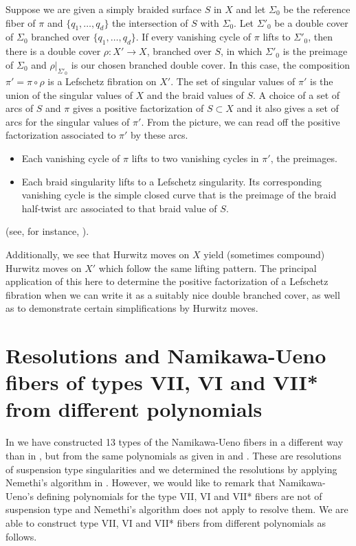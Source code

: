\documentclass[11pt,letterpaper,reqno]{amsart}
\theoremstyle{remark}
\begin{document}
Suppose we are given a simply braided surface $S$ in $X$ and let $\Sigma_0$ be the reference fiber of $\pi$ and $\{q_1, \dots, q_d\}$ the intersection of $S$ with $\Sigma_0$. Let $\Sigma'_0$ be a double cover of $\Sigma_0$ branched over $\{q_1, \dots, q_d\}$. If every vanishing cycle of $\pi$ lifts to $\Sigma'_0$, then there is a double cover $\rho:X' \rightarrow X$, branched over $S$, in which $\Sigma'_0$ is the preimage of $\Sigma_0$ and $\rho|_{\Sigma'_0}$ is our chosen branched double cover. In this case, the composition $\pi' = \pi\circ \rho$ is a Lefschetz fibration on $X'$. The set of singular values of $\pi'$ is the union of the singular values of $X$ and the braid values of $S$. A choice of a set of arcs of $S$ and $\pi$ gives a positive factorization of $S \subset X$ and it also gives a set of arcs for the singular values of $\pi'$. From the picture, we can read off the positive factorization associated to $\pi'$ by these arcs.
\begin{itemize}
\item Each vanishing cycle of $\pi$ lifts to two vanishing cycles in $\pi'$, the preimages.
\item Each braid singularity lifts to a Lefschetz singularity. Its corresponding vanishing cycle is the simple closed curve that is the preimage of the braid half-twist arc associated to that braid value of $S$.
\end{itemize}

(see, for instance, \cite{AurouxKatzarkov, IT}). 

Additionally, we see that Hurwitz moves on $X$ yield (sometimes compound) Hurwitz moves on $X'$ which follow the same lifting pattern. The principal application of this here to determine the positive factorization of a Lefschetz fibration when we can write it as a suitably nice double branched cover, as well as to demonstrate certain simplifications by Hurwitz moves. 




\section{Resolutions and Namikawa-Ueno fibers of types VII, VI and VII* from different polynomials} 
\label{sec:resolutions}

In \cite{SV} we have constructed 13 types of the Namikawa-Ueno fibers in a different way than in \cite{NamikawaUeno-long}, but from the same polynomials as given in \cite{NamikawaUeno-long} and \cite{NamikawaUeno-list}. These are resolutions of suspension type singularities and we determined the resolutions by applying Nemethi's algorithm in \cite{Nemethi-algorithm}. However, we would like to remark that Namikawa-Ueno's defining polynomials for the type VII, VI and VII* fibers are not of suspension type and Nemethi's algorithm does not apply to resolve them. We are able to construct type VII, VI and VII* fibers from different polynomials as follows.  
\end{document}
